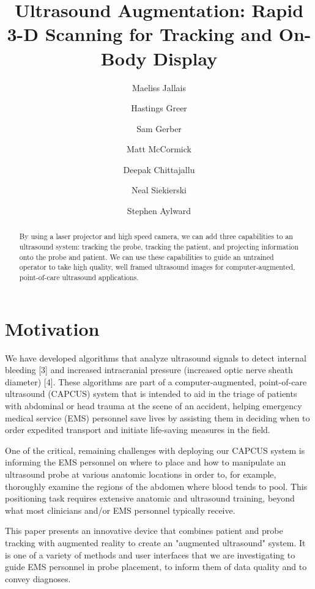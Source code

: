 \documentclass{llncs}
\begin{document}
%
\frontmatter
%
\pagestyle{headings}
\title{Ultrasound Augmentation: Rapid 3-D Scanning for Tracking and On-Body Display}
\author{Maeliss Jallais \and Hastings Greer \and Sam Gerber \and Matt McCormick \and Deepak Chittajallu \and Neal Siekierski \and Stephen Aylward}
%
\mainmatter
\maketitle

\begin{abstract}
By using a laser projector and high speed camera, we can add three capabilities to an ultrasound system: tracking the probe, tracking the patient, and projecting information onto the probe and patient. We can use these capabilities to guide an untrained operator to take high quality, well framed ultrasound images for computer-augmented, point-of-care ultrasound applications.
\end{abstract}


\section{Motivation}
We have developed algorithms that analyze ultrasound signals to detect internal bleeding [3] and increased intracranial pressure (increased optic nerve sheath diameter) [4]. These algorithms are part of a computer-augmented, point-of-care ultrasound (CAPCUS) system that is intended to aid in the triage of patients with abdominal or head trauma at the scene of an accident, helping emergency medical service (EMS) personnel save lives by assisting them in deciding when to order expedited transport and initiate life-saving measures in the field.

One of the critical, remaining challenges with deploying our CAPCUS system is informing the EMS personnel on where to place and how to manipulate an ultrasound probe at various anatomic locations in order to, for example, thoroughly examine the regions of the abdomen where blood tends to pool. This positioning task requires extensive anatomic and ultrasound training, beyond what most clinicians and/or EMS personnel typically receive.

This paper presents an innovative device that combines patient and probe tracking with augmented reality to create an "augmented ultrasound" system.  It is one of a variety of methods and user interfaces that we are investigating to guide EMS personnel in probe placement, to inform them of data quality and to convey diagnoses.
\end{document}
